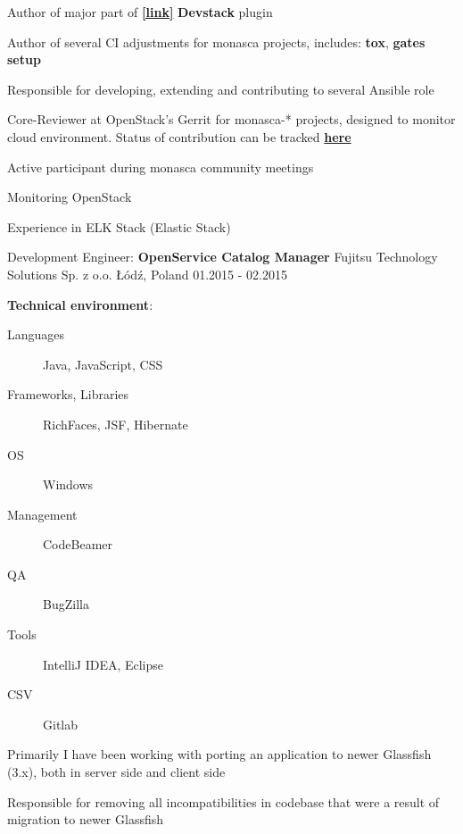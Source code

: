 \begin{cventries}
{\begin{cvitems}
      \item{Author of major part of
          \href{https://github.com/openstack/monasca-log-api}{\textbf{[\faGithubSquare\acvHeaderIconSep link]}} \textbf{Devstack} plugin}
      \item{Author of several CI adjustments for monasca projects, includes: \textbf{tox}, \textbf{gates setup}}
      \item{Responsible for developing, extending and contributing to several Ansible role}
      \item{Core-Reviewer at OpenStack’s Gerrit for monasca-* projects,
          designed to monitor cloud environment. Status of contribution can be tracked
          \href{http://stackalytics.com/?user_id=kornicameister&release=all&project_type=all&metric=person-day}{\textbf{here}}}
      \item{Active participant during monasca community meetings}
      \item{Monitoring OpenStack}
      \item{Experience in ELK Stack (Elastic Stack)}
    \end{cvitems}
  }

  \cventry
  {Development Engineer: \textbf{OpenService Catalog Manager}}
  {Fujitsu Technology Solutions Sp. z o.o.}
  {Łódź, Poland}
  {01.2015 - 02.2015}
  {
    \begin{cvitems}
       \item[]{
            \textbf{Technical environment}:
            \begin{description}
                \item[Languages] Java, JavaScript, CSS
                \item[Frameworks, Libraries] RichFaces, JSF, Hibernate
                \item[OS] Windows
                \item[Management] CodeBeamer
                \item[QA] BugZilla
                \item[Tools] IntelliJ IDEA, Eclipse
                \item[CSV] \faGitlab\acvHeaderIconSep Gitlab
            \end{description}
       }
       \item{Primarily I have been working with porting an application
             to newer Glassfish (3.x), both
             in server side and client side}
       \item{Responsible for removing all incompatibilities in codebase that
             were a result of migration to newer Glassfish}
    \end{cvitems}
  }


\end{cventries}
